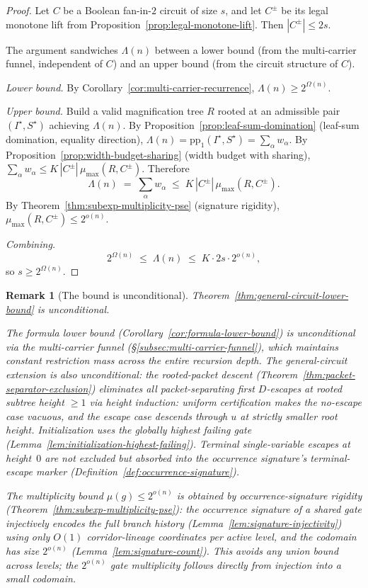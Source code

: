 \documentclass[11pt]{article}
\newtheorem{remark}[theorem]{Remark}
\begin{document}
\begin{proof}
Let $C$ be a Boolean fan-in-$2$ circuit of size $s$, and let $C^{\pm}$
be its legal monotone lift from
Proposition~\ref{prop:legal-monotone-lift}.  Then $|C^{\pm}|\le 2s$.

The argument sandwiches $\Lambda(n)$ between a lower bound (from the
multi-carrier funnel, independent of $C$) and an upper bound (from the
circuit structure of $C$).

\emph{Lower bound.}
By Corollary~\ref{cor:multi-carrier-recurrence},
$\Lambda(n)\ge 2^{\Omega(n)}$.

\emph{Upper bound.}
Build a valid magnification tree $R$ rooted at an admissible pair
$(I^\star, S^\star)$ achieving $\Lambda(n)$.  By
Proposition~\ref{prop:leaf-sum-domination} (leaf-sum domination,
equality direction),
$\Lambda(n) = \mathrm{pp}_1(I^\star, S^\star)
= \sum_\alpha w_\alpha$.
By Proposition~\ref{prop:width-budget-sharing} (width budget with
sharing), $\sum_\alpha w_\alpha \le K\,|C^{\pm}|\,\mu_{\max}(R,C^{\pm})$.
Therefore
\[
\Lambda(n) \;=\; \sum_\alpha w_\alpha
\;\le\; K\,|C^{\pm}|\,\mu_{\max}(R,C^{\pm}).
\]
By Theorem~\ref{thm:subexp-multiplicity-pse} (signature rigidity),
$\mu_{\max}(R,C^{\pm})\le 2^{o(n)}$.

\emph{Combining.}
\[
2^{\Omega(n)} \;\le\; \Lambda(n)
\;\le\; K\cdot 2s\cdot 2^{o(n)},
\]
so $s\ge 2^{\Omega(n)}$.
\end{proof}

\begin{remark}[The bound is unconditional]
\label{rem:general-circuit-status}
Theorem~\ref{thm:general-circuit-lower-bound} is unconditional.

The formula lower bound (Corollary~\ref{cor:formula-lower-bound}) is
unconditional via the multi-carrier funnel
(\S\ref{subsec:multi-carrier-funnel}), which maintains constant
restriction mass across the entire recursion depth.  The general-circuit
extension is also unconditional: the rooted-packet descent
(Theorem~\ref{thm:packet-separator-exclusion}) eliminates all
packet-separating first $D$-escapes at rooted subtree height $\ge 1$
via height induction: uniform certification makes the no-escape case
vacuous, and the escape case descends through $u$ at strictly smaller
root height.  Initialization uses the globally highest failing gate
(Lemma~\ref{lem:initialization-highest-failing}).  Terminal
single-variable escapes at height~$0$ are not excluded but
\emph{absorbed} into the occurrence signature's terminal-escape marker
(Definition~\ref{def:occurrence-signature}).

The multiplicity bound $\mu(g) \le 2^{o(n)}$ is obtained by
occurrence-signature rigidity
(Theorem~\ref{thm:subexp-multiplicity-pse}): the occurrence signature
of a shared gate injectively encodes the full branch history
(Lemma~\ref{lem:signature-injectivity}) using only $O(1)$
corridor-lineage coordinates per active level, and the codomain has size
$2^{o(n)}$ (Lemma~\ref{lem:signature-count}).  This avoids any union
bound across levels; the $2^{o(n)}$ gate multiplicity follows directly
from injection into a small codomain.
\end{remark}
\end{document}
